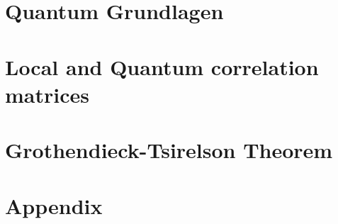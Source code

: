 \newpage
\section{Quantum Grundlagen} %
	\vspace{8pt}
	


\section{Local and Quantum correlation matrices} %
	\vspace{8pt}

	
\section{Grothendieck-Tsirelson Theorem} %
	
 
\section*{Appendix}
		



	
